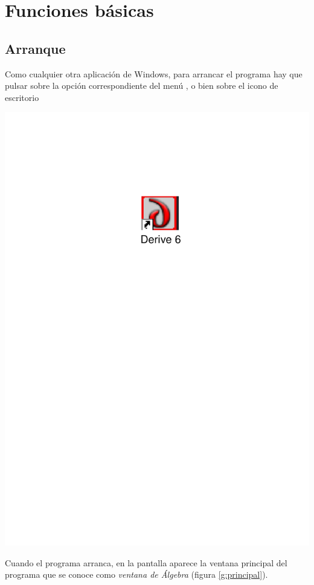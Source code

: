 \section{Funciones básicas}
\subsection*{Arranque}
Como cualquier otra aplicación de Windows, para arrancar el programa
hay que pulsar sobre la opción correspondiente del menú
, o bien sobre el icono de escritorio


\begin{center}
\includegraphics[scale=0.4]{img/introduccion_derive/icono}
\end{center}

Cuando el programa arranca, en la pantalla aparece la ventana
principal del programa que se conoce como \emph{ventana de Álgebra}
(figura \ref{g:principal}).

